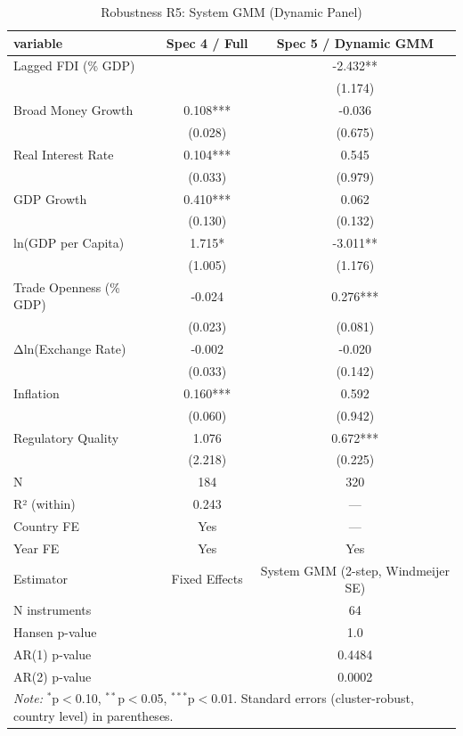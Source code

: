 \begin{table}[htbp]
\centering
\caption{Robustness R5: System GMM (Dynamic Panel)}
\label{tab:robustness_r5_gmm}
\begin{tabular}{lcc}
\hline\hline
variable & Spec 4 / Full & Spec 5 / Dynamic GMM \\
\hline
Lagged FDI (\% GDP) &  & -2.432** \\
 &  & (1.174) \\
Broad Money Growth & 0.108*** & -0.036 \\
 & (0.028) & (0.675) \\
Real Interest Rate & 0.104*** & 0.545 \\
 & (0.033) & (0.979) \\
GDP Growth & 0.410*** & 0.062 \\
 & (0.130) & (0.132) \\
ln(GDP per Capita) & 1.715* & -3.011** \\
 & (1.005) & (1.176) \\
Trade Openness (\% GDP) & -0.024 & 0.276*** \\
 & (0.023) & (0.081) \\
Δln(Exchange Rate) & -0.002 & -0.020 \\
 & (0.033) & (0.142) \\
Inflation & 0.160*** & 0.592 \\
 & (0.060) & (0.942) \\
Regulatory Quality & 1.076 & 0.672*** \\
 & (2.218) & (0.225) \\
\hline
N & 184 & 320 \\
R² (within) & 0.243 & — \\
Country FE & Yes & — \\
Year FE & Yes & Yes \\
Estimator & Fixed Effects & System GMM (2-step, Windmeijer SE) \\
N instruments &  & 64 \\
Hansen p-value &  & 1.0 \\
AR(1) p-value &  & 0.4484 \\
AR(2) p-value &  & 0.0002 \\
\hline\hline
\multicolumn{3}{l}{\textit{Note:} $^{*}$p$<$0.10, $^{**}$p$<$0.05, $^{***}$p$<$0.01. Standard errors (cluster-robust, country level) in parentheses.}
\end{tabular}
\end{table}